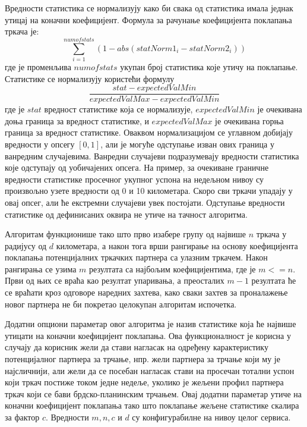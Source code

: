 \documentclass[12pt,oneside]{memoir}
\begin{document}
Вредности статистика се нормализују како би свака од статистика имала једнак утицај на коначни коефицијент. Формула за рачунање коефицијента поклапања тркача је: \[ \sum_{i=1}^{numofstats} (1 - abs(statNorm1_i - statNorm2_i)) \] где је променљива $numofstats$ укупан број статистика које утичу на поклапање. Статистике се нормализују користећи формулу \[\frac{stat - expectedValMin}{expectedValMax - expectedValMin}\] где је $stat$ вредност статистике која се нормализује, $expectedValMin$ је очекивана доња граница за вредност статистике, и $expectedValMax$ је очекивана горња граница за вредност статистике. Оваквом нормализацијом се углавном добијају вредности у опсегу $[0, 1]$, али је могуће одступање изван ових граница у ванредним случајевима. Ванредни случајеви подразумевају вредности статистика које одступају од уобичајених опсега. На пример, за очекиване граничне вредности статистике просечног укупног успона на недељном нивоу су произвољно узете вредности од 0 и 10 километара. Скоро сви тркачи упадају у овај опсег, али ће екстремни случајеви увек постојати. Одступање вредности статистике од дефинисаних оквира не утиче на тачност алгоритма.

Алгоритам функционише тако што прво изабере групу од највише $n$ тркача у радијусу од $d$ километара, а након тога врши рангирање на основу коефицијента поклапања потенцијалних тркачких партнера са улазним тркачем. Након рангирања се узима $m$ резултата са најбољим коефицијентима, где је $m <= n$. Први од њих се враћа као резултат упаривања, а преосталих $m-1$ резултата ће се враћати кроз одговоре наредних захтева, како сваки захтев за проналажење новог партнера не би покретао целокупан алгоритам испочетка.

Додатни опциони параметар овог алгоритма је назив статистике која ће највише утицати на коначни коефицијент поклапања. Ова функционалност је корисна у случају да корисник жели да стави нагласак на одређену карактеристику потенцијалног партнера за трчање, нпр. жели партнера за трчање који му је најсличнији, али жели да се посебан нагласак стави на просечан тотални успон који тркач постиже током једне недеље, уколико је жељени профил партнера тркач који се бави брдско-планинским трчањем. Овај додатни параметар утиче на коначни коефицијент поклапања тако што поклапање жељене статистике скалира за фактор $c$. Вредности $m, n, c$ и $d$ су конфигурабилне на нивоу целог сервиса.
\end{document}
